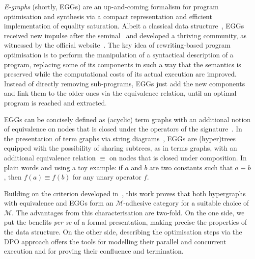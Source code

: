 \documentclass[a4paper,UKenglish,cleveref,pdftex,thm-restate,numberwithinsect]{lipics-v2021}
\begin{document}
\emph{E-graphs} (shortly, EGGs) are an up-and-coming formalism for program optimisation and synthesis via a compact 
representation and efficient implementation of equality saturation. 
%
Albeit a classical data structure~\cite{DetlefsNS05}, EGGs received 
new impulse after the seminal~\cite{WillseyNWFTP21} and
developed a thriving community, as witnessed by the official website~\cite{eggs}.
%
The key idea of rewriting-based program optimisation is to perform the manipulation of a syntactical description 
of a program, replacing some of its components in such a way that the semantics is preserved while 
the computational costs of its actual execution are improved. Instead of directly removing sub-programs, EGGs just add the 
new components and link them to the older ones via the equivalence relation, until an optimal program is 
reached and extracted.

EGGs can be concisely defined as (acyclic) term graphs with an additional notion of equivalence on nodes
that is closed under the operators of the signature~\cite[Section~4.2]{DetlefsNS05}.
In the presentation of term graphs via string diagrams~\cite{CastelnovoGM24}, EGGs are (hyper)trees equipped with 
the possibility of sharing subtrees, as in terms graphs, with an additional equivalence relation $\equiv$ on nodes that 
is closed under composition. In plain words and using a toy example:
if $a$ and $b$ are two constants such that $a \equiv b$, then $f(a) \equiv f(b)$ for any unary operator $f$.



Building on the criterion developed in~\cite{CastelnovoGM24}, this work proves that both hypergraphs with equivalence
and EGGs form an 
$\mathcal{M}$-adhesive category for a suitable choice of $\mathcal{M}$.
The advantages from this characterisation are two-fold. On the one side, 
we put the benefits \emph{per se} of a formal presentation, making precise the properties of the data structure. 
On the other side, describing the optimisation steps via the DPO approach
offers the tools for modelling their parallel and concurrent execution
and for proving their confluence and termination.
\end{document}

